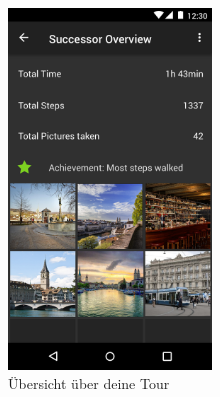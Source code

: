\documentclass[a4paper,10pt,xetex]{article}
\begin{document}
\begin{figure}
  \begin{center}
    \includegraphics[width=0.48\textwidth]{SummaryActivity}
    \caption{Übersicht über deine Tour}
  \end{center}
\end{figure}

\end{document}

